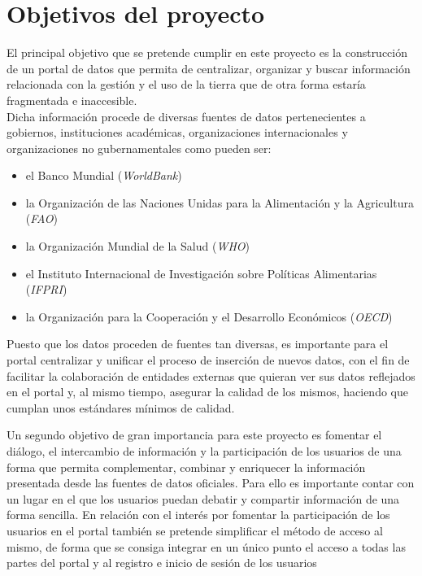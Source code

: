 {\section{Objetivos del proyecto}
\label{objetivos_proyecto}
El principal objetivo que se pretende cumplir en este proyecto es la construcción de un portal de datos que permita de centralizar, organizar y buscar información relacionada con la gestión y el uso de la tierra que de otra forma estaría fragmentada e inaccesible.\\
Dicha información procede de diversas fuentes de datos pertenecientes a gobiernos, instituciones académicas, organizaciones internacionales y organizaciones no gubernamentales como pueden ser:
\begin{itemize}
\item el Banco Mundial (\textit{WorldBank})
\item la Organización de las Naciones Unidas para la Alimentación y la Agricultura (\textit{FAO})
\item la Organización Mundial de la Salud (\textit{WHO})
\item el Instituto Internacional de Investigación sobre Políticas Alimentarias (\textit{IFPRI})
\item la Organización para la Cooperación y el Desarrollo Económicos (\textit{OECD})
\end{itemize}
Puesto que los datos proceden de fuentes tan diversas, es importante para el portal centralizar y unificar el proceso de inserción de nuevos datos, con el fin de facilitar la colaboración de entidades externas que quieran ver sus datos reflejados en el portal y, al mismo tiempo, asegurar la calidad de los mismos, haciendo que cumplan unos estándares mínimos de calidad.

Un segundo objetivo de gran importancia para este proyecto es fomentar el diálogo, el intercambio de información y la participación de los usuarios de una forma que permita complementar, combinar y enriquecer la información presentada desde las fuentes de datos oficiales. Para ello es importante contar con un lugar en el que los usuarios puedan debatir y compartir información de una forma sencilla.\newline
En relación con el interés por fomentar la participación de los usuarios en el portal también se pretende simplificar el método de acceso al mismo, de forma que se consiga integrar en un único punto el acceso a todas las partes del portal y al registro e inicio de sesión de los usuarios

}
